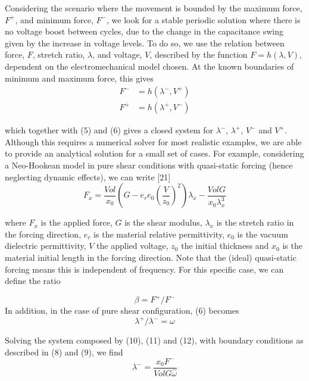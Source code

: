 Considering the scenario where the movement is bounded by the maximum force, $F^+$, and minimum force, $F^-$, we look for a stable periodic solution where there is no voltage boost between cycles, due to the change in the capacitance swing given by the increase in voltage levels. To do so, we use the relation between force, $F$, stretch ratio, $\lambda$, and voltage, $V$, described by the function $F= h(\lambda,V)$, dependent on the electromechanical model chosen. At the known boundaries of minimum and maximum force, this gives
\begin{align}
F^-&=  h(\lambda^-,V^+)\\
F^+&=  h(\lambda^+,V^-) 
\end{align}

which together with (5) and (6) gives a closed system for $\lambda^-$, $\lambda^+$, $V^-$ and $V^+$. Although this requires a numerical solver for most realistic examples, we are able to provide an analytical solution for a small set of cases. For example, considering a Neo-Hookean model in pure shear conditions with quasi-static forcing (hence neglecting dynamic effects), we can write [21]
\begin{equation}
F_x=   \frac{Vol}{x_0}\left(G-e_r e_0 \left(\frac{V}{z_0} \right)^2 \right) \lambda_x-\frac{Vol G}{x_0 \lambda_x^3 }
\end{equation}

where $F_x$ is the applied force, $G$ is the shear modulus, $\lambda_x$   is the stretch ratio in the forcing direction, $e_r$ is the material relative permittivity, $e_0$ is the vacuum dielectric permittivity, $V$ the applied voltage, $z_0$ the initial thickness and $x_0$ is the material initial length in the forcing direction. Note that the (ideal) quasi-static forcing means this is independent of frequency.
For this specific case, we can define the ratio

\begin{equation}
\beta=F^+/F^-
\end{equation}
In addition, in the case of pure shear configuration, (6) becomes
\begin{equation}
\lambda^+/\lambda^- =\omega
\end{equation}

Solving the system composed by (10), (11) and (12), with boundary conditions as described in (8) and (9), we find 
\begin{equation}
\lambda^-=\frac{x_0 F^-}{VolG\hat{\omega}}
\end{equation}

